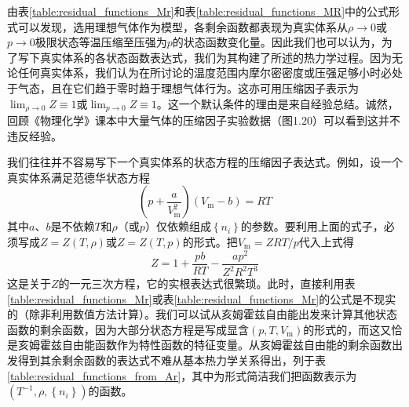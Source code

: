 \documentclass[main.tex]{subfiles}
\begin{document}
由表\ref{table:residual_functions_Mr}和表\ref{table:residual_functions_MR}中的公式形式可以发现，选用理想气体作为模型，各剩余函数都表现为真实体系从$\rho\rightarrow 0$或$p\rightarrow 0$极限状态等温压缩至压强为$p$的状态函数变化量。因此我们也可以认为，为了写下真实体系的各状态函数表达式，我们为其构建了所述的热力学过程。因为无论任何真实体系，我们认为在所讨论的温度范围内摩尔密密度或压强足够小时必处于气态，且在它们趋于零时趋于理想气体行为。这亦可用压缩因子表示为$\lim_{\rho\to 0}Z\equiv 1$或$\lim_{p\to 0}Z\equiv1$。这一个默认条件的理由是来自经验总结。诚然，回顾《物理化学》课本中大量气体的压缩因子实验数据（图1.20）可以看到这并不违反经验。

我们往往并不容易写下一个真实体系的状态方程的压缩因子表达式。例如，设一个真实体系满足范德华状态方程
\[\left(p+\frac{a}{V_\text{m}^2}\right)\left(V_\text{m}-b\right)=RT\]
其中$a$、$b$是不依赖$T$和$\rho$（或$p$）仅依赖组成$\left\{n_i\right\}$的参数。要利用上面的式子，必须写成$Z=Z\left(T,\rho\right)$或$Z=Z\left(T,p\right)$的形式。把$V_\text{m}=ZRT/p$代入上式得
\[Z=1+\frac{pb}{RT}-\frac{ap^2}{Z^2R^2T^3}\]
这是关于$Z$的一元三次方程，它的实根表达式很繁琐。此时，直接利用表\ref{table:residual_functions_Mr}或表\ref{table:residual_functions_Mr}的公式是不现实的（除非利用数值方法计算）。我们可以试从亥姆霍兹自由能出发来计算其他状态函数的剩余函数，因为大部分状态方程是写成显含$\left(p,T,V_\text{m}\right)$的形式的，而这又恰是亥姆霍兹自由能函数作为特性函数的特征变量。从亥姆霍兹自由能的剩余函数出发得到其余剩余函数的表达式不难从基本热力学关系得出，列于表\ref{table:residual_functions_from_Ar}，其中为形式简洁我们把函数表示为$\left(T^{-1},\rho,\left\{n_i\right\}\right)$的函数。
\end{document}
